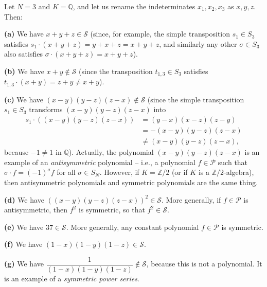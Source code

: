 \begin{example}
\label{exa.sf.PS1}Let $N=3$ and $K=\mathbb{Q}$, and let us rename the
indeterminates $x_{1},x_{2},x_{3}$ as $x,y,z$. Then: \medskip

\textbf{(a)} We have $x+y+z\in\mathcal{S}$ (since, for example, the simple
transposition $s_{1}\in S_{3}$ satisfies $s_{1}\cdot\left(  x+y+z\right)
=y+x+z=x+y+z$, and similarly any other $\sigma\in S_{3}$ also satisfies
$\sigma\cdot\left(  x+y+z\right)  =x+y+z$). \medskip

\textbf{(b)} We have $x+y\notin\mathcal{S}$ (since the transposition
$t_{1,3}\in S_{3}$ satisfies $t_{1,3}\cdot\left(  x+y\right)  =z+y\neq x+y$).
\medskip

\textbf{(c)} We have $\left(  x-y\right)  \left(  y-z\right)  \left(
z-x\right)  \notin\mathcal{S}$ (since the simple transposition $s_{1}\in
S_{3}$ transforms $\left(  x-y\right)  \left(  y-z\right)  \left(  z-x\right)
$ into
\begin{align*}
s_{1}\cdot\left(  \left(  x-y\right)  \left(  y-z\right)  \left(  z-x\right)
\right)   &  =\left(  y-x\right)  \left(  x-z\right)  \left(  z-y\right) \\
&  =-\left(  x-y\right)  \left(  y-z\right)  \left(  z-x\right) \\
&  \neq\left(  x-y\right)  \left(  y-z\right)  \left(  z-x\right)  ,
\end{align*}
because $-1\neq1$ in $\mathbb{Q}$). Actually, the polynomial $\left(
x-y\right)  \left(  y-z\right)  \left(  z-x\right)  $ is an example of an
\emph{antisymmetric} polynomial -- i.e., a polynomial $f\in\mathcal{P}$ such
that $\sigma\cdot f=\left(  -1\right)  ^{\sigma}f$ for all $\sigma\in S_{N}$.
However, if $K=\mathbb{Z}/2$ (or if $K$ is a $\mathbb{Z}/2$-algebra), then
antisymmetric polynomials and symmetric polynomials are the same thing.
\medskip

\textbf{(d)} We have $\left(  \left(  x-y\right)  \left(  y-z\right)  \left(
z-x\right)  \right)  ^{2}\in\mathcal{S}$. More generally, if $f\in\mathcal{P}$
is antisymmetric, then $f^{2}$ is symmetric, so that $f^{2}\in\mathcal{S}$.
\medskip

\textbf{(e)} We have $37\in\mathcal{S}$. More generally, any constant
polynomial $f\in\mathcal{P}$ is symmetric. \medskip

\textbf{(f)} We have $\left(  1-x\right)  \left(  1-y\right)  \left(
1-z\right)  \in\mathcal{S}$. \medskip

\textbf{(g)} We have $\dfrac{1}{\left(  1-x\right)  \left(  1-y\right)
\left(  1-z\right)  }\notin\mathcal{S}$, because this is not a polynomial. It
is an example of a \emph{symmetric power series}.
\end{example}

